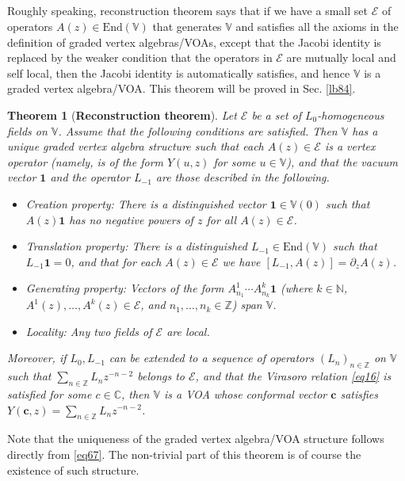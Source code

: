 \documentclass[11pt,b5paper,notitlepage]{article}
\theoremstyle{definition}
\theoremstyle{plain}
\newtheorem{thm}[df]{Theorem}
\newcommand{\mc}{\mathcal}
\newcommand{\End}{\mathrm{End}} %
\newcommand{\id}{\mathbf{1}}
\newcommand{\Vbb}{\mathbb V}
\newcommand{\Cbb}{\mathbb C}
\newcommand{\Nbb}{\mathbb N}
\newcommand{\Zbb}{\mathbb Z}
\newcommand{\cbf}{\mathbf c}
\numberwithin{equation}{section}
\begin{document}
\subsection{}




Roughly speaking, reconstruction theorem says that if we have a small set $\mc E$ of operators $A(z)\in\End(\Vbb)$ that generates $\Vbb$ and satisfies all the axioms in the definition of graded vertex algebras/VOAs, except that the Jacobi identity is replaced by the weaker condition that the operators in $\mc E$ are mutually local and self local, then the Jacobi identity is automatically satisfies, and hence $\Vbb$ is a graded vertex algebra/VOA. This theorem will be proved in Sec. \ref{lb84}.


\begin{thm}[\textbf{Reconstruction theorem}]\label{lb39}
Let $\mc E$ be a set of $L_0$-homogeneous fields on $\Vbb$.  Assume that the following conditions are satisfied. Then $\Vbb$ has a unique graded vertex algebra structure such that each $A(z)\in\mc E$ is a vertex operator (namely, is of the form $Y(u,z)$ for some $u\in\Vbb$), and that the vacuum vector $\id$ and the operator $L_{-1}$  are those described in the following.
\begin{itemize}
\item Creation property: There is a distinguished vector $\id\in\Vbb(0)$ such that $A(z)\id$ has no negative powers of $z$ for all $A(z)\in\mc E$.
\item Translation property: There is a distinguished $L_{-1}\in\End(\Vbb)$ such that $L_{-1}\id=0$, and that for each $A(z)\in\mc E$ we have $[L_{-1},A(z)]=\partial_zA(z)$.
\item Generating property: Vectors of the form $A^1_{n_1}\cdots A^k_{n_k}\id$ (where $k\in\Nbb$, $A^1(z),\dots,A^k(z)\in\mc E$, and $n_1,\dots,n_k\in\Zbb$) span $\Vbb$. 
\item Locality: Any two fields of $\mc E$ are local.
\end{itemize}
Moreover, if $L_0,L_{-1}$ can be extended to a sequence of operators $(L_n)_{n\in\Zbb}$ on $\Vbb$ such that $\sum_{n\in\Zbb}L_nz^{-n-2}$ belongs to $\mc E$, and that the Virasoro relation \eqref{eq16} is satisfied for some $c\in\Cbb$, then $\Vbb$ is a VOA whose conformal vector $\cbf$ satisfies $Y(\cbf,z)=\sum_{n\in\Zbb}L_nz^{-n-2}$.
\end{thm}
Note that the uniqueness of the graded vertex algebra/VOA structure follows directly from \eqref{eq67}. The non-trivial part of this theorem is of course the existence of such structure.
\end{document}
